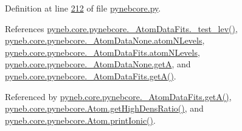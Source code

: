 Definition at line \hyperlink{pynebcore_8py_source_l00212}{212} of file \hyperlink{pynebcore_8py_source}{pynebcore.\-py}.



References \hyperlink{pynebcore_8py_source_l00178}{pyneb.\-core.\-pynebcore.\-\_\-\-Atom\-Data\-Fits.\-\_\-test\-\_\-lev()}, \hyperlink{pynebcore_8py_source_l00068}{pyneb.\-core.\-pynebcore.\-\_\-\-Atom\-Data\-None.\-atom\-N\-Levels}, \hyperlink{pynebcore_8py_source_l00155}{pyneb.\-core.\-pynebcore.\-\_\-\-Atom\-Data\-Fits.\-atom\-N\-Levels}, \hyperlink{pynebcore_8py_source_l00067}{pyneb.\-core.\-pynebcore.\-\_\-\-Atom\-Data\-None.\-get\-A}, and \hyperlink{pynebcore_8py_source_l00212}{pyneb.\-core.\-pynebcore.\-\_\-\-Atom\-Data\-Fits.\-get\-A()}.



Referenced by \hyperlink{pynebcore_8py_source_l00212}{pyneb.\-core.\-pynebcore.\-\_\-\-Atom\-Data\-Fits.\-get\-A()}, \hyperlink{pynebcore_8py_source_l01719}{pyneb.\-core.\-pynebcore.\-Atom.\-get\-High\-Dens\-Ratio()}, and \hyperlink{pynebcore_8py_source_l02233}{pyneb.\-core.\-pynebcore.\-Atom.\-print\-Ionic()}.


